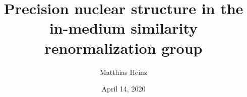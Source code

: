 \documentclass[12pt]{memoir}
\title{Precision nuclear structure in the \\ in-medium similarity renormalization group}
\author{Matthias Heinz}
\date{April 14, 2020}
\begin{document}
\frontmatter{}

\maketitle

\cleardoublepage

\cleardoublepage


% 

\cleardoublepage\tableofcontents


\cleardoublepage\listoffigures



\mainmatter{}













\begin{appendices}

% 

\end{appendices}

\backmatter{}


\end{document}
